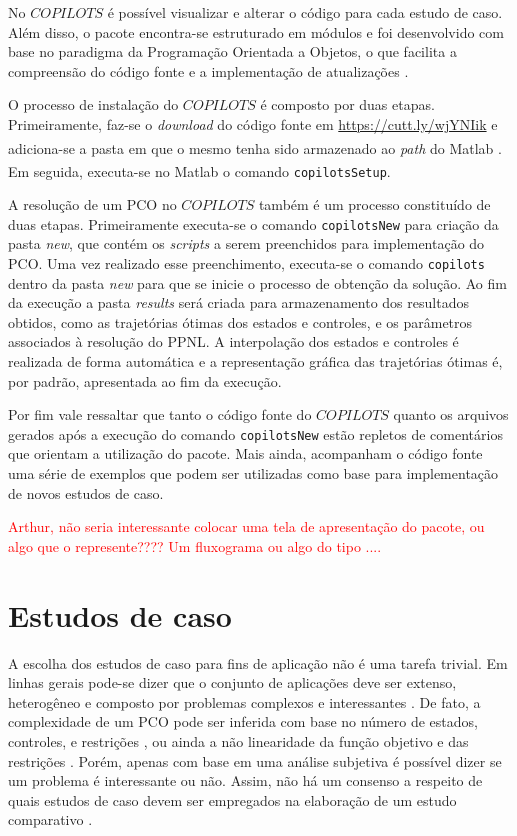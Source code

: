 No $ COPILOTS $ é possível visualizar e alterar o código para cada estudo de caso. Além disso, o pacote encontra-se estruturado em módulos e foi desenvolvido com base no paradigma da Programação Orientada a Objetos, o que facilita a compreensão do código fonte e a implementação de atualizações \cite{parejo_metaheuristic_2012}.

O processo de instalação do $ COPILOTS $ é composto por duas etapas. Primeiramente, faz-se o \textit{download} do código fonte em \url{https://cutt.ly/wjYNIik} e adiciona-se a pasta em que o mesmo tenha sido armazenado ao \textit{path} do Matlab\textsuperscript{\textregistered}  \cite{mathworks_change_2020}. Em seguida, executa-se no Matlab\textsuperscript{\textregistered} o comando \texttt{copilotsSetup}. 

A resolução de um PCO no $ COPILOTS $ também é um processo constituído de duas etapas. Primeiramente executa-se o comando \texttt{copilotsNew} para criação da pasta \textit{new}, que contém os \textit{scripts} a serem preenchidos para implementação do PCO. Uma vez realizado esse preenchimento, executa-se o comando \texttt{copilots} dentro da pasta \textit{new} para que se inicie o processo de obtenção da solução. Ao fim da execução a pasta \textit{results} será criada para armazenamento dos resultados obtidos, como as trajetórias ótimas dos estados e controles, e os parâmetros associados à resolução do PPNL. A interpolação dos estados e controles é realizada de forma automática e a representação gráfica das trajetórias ótimas é, por padrão, apresentada ao fim da execução.

Por fim vale ressaltar que tanto o código fonte do $COPILOTS$ quanto os arquivos gerados após a execução do comando \texttt{copilotsNew} estão repletos de comentários que orientam a utilização do pacote. Mais ainda, acompanham o código fonte uma série de exemplos que podem ser utilizadas como base para implementação de novos estudos de caso.

\textcolor{red}{Arthur, não seria interessante colocar uma tela de apresentação do pacote, ou algo que o represente???? Um fluxograma ou algo do tipo ....}

\section{Estudos de caso}

A escolha dos estudos de caso para fins de aplicação não é uma tarefa trivial. Em linhas gerais pode-se dizer que o conjunto de aplicações deve ser extenso, heterogêneo \cite{bongartz_numerical_1997} e composto por problemas complexos e interessantes \cite{dolan_benchmarking_2002}. De fato, a complexidade de um PCO pode ser inferida com base no número de estados, controles, e restrições \cite{dolan_benchmarking_2002}, ou ainda a não linearidade da função objetivo e das restrições \cite{bongartz_numerical_1997}. Porém, apenas com base em uma análise subjetiva é possível dizer se um problema é interessante ou não. Assim, não há um consenso a respeito de quais estudos de caso devem ser empregados na elaboração de um estudo comparativo \cite{dolan_benchmarking_2002}. 

